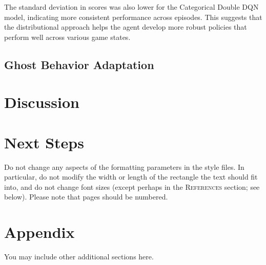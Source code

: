 \documentclass{article} %
\begin{document}
The standard deviation in scores was also lower for the Categorical Double DQN model, indicating more consistent performance across episodes. This suggests that the distributional approach helps the agent develop more robust policies that perform well across various game states.

\subsection{Ghost Behavior Adaptation}



\section{Discussion}



\section{Next Steps}
Do not change any aspects of the formatting parameters in the style files.
In particular, do not modify the width or length of the rectangle the text
should fit into, and do not change font sizes (except perhaps in the
\textsc{References} section; see below). Please note that pages should be
numbered.




\appendix
\section{Appendix}
You may include other additional sections here.
\end{document}
